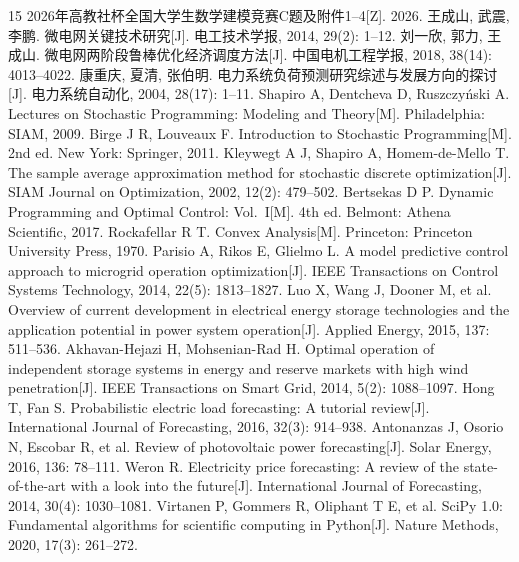 \documentclass[withoutpreface,bwprint]{cumcmthesis}
\begin{document}
\begin{thebibliography}{15}
 2026年高教社杯全国大学生数学建模竞赛C题及附件1--4[Z]. 2026.
 王成山, 武震, 李鹏. 微电网关键技术研究[J]. 电工技术学报, 2014, 29(2): 1--12.
 刘一欣, 郭力, 王成山. 微电网两阶段鲁棒优化经济调度方法[J]. 中国电机工程学报, 2018, 38(14): 4013--4022.
 康重庆, 夏清, 张伯明. 电力系统负荷预测研究综述与发展方向的探讨[J]. 电力系统自动化, 2004, 28(17): 1--11.
 Shapiro A, Dentcheva D, Ruszczy\'nski A. Lectures on Stochastic Programming: Modeling and Theory[M]. Philadelphia: SIAM, 2009.
 Birge J R, Louveaux F. Introduction to Stochastic Programming[M]. 2nd ed. New York: Springer, 2011.
 Kleywegt A J, Shapiro A, Homem-de-Mello T. The sample average approximation method for stochastic discrete optimization[J]. SIAM Journal on Optimization, 2002, 12(2): 479--502.
 Bertsekas D P. Dynamic Programming and Optimal Control: Vol.~I[M]. 4th ed. Belmont: Athena Scientific, 2017.
 Rockafellar R T. Convex Analysis[M]. Princeton: Princeton University Press, 1970.
 Parisio A, Rikos E, Glielmo L. A model predictive control approach to microgrid operation optimization[J]. IEEE Transactions on Control Systems Technology, 2014, 22(5): 1813--1827.
 Luo X, Wang J, Dooner M, et al. Overview of current development in electrical energy storage technologies and the application potential in power system operation[J]. Applied Energy, 2015, 137: 511--536.
 Akhavan-Hejazi H, Mohsenian-Rad H. Optimal operation of independent storage systems in energy and reserve markets with high wind penetration[J]. IEEE Transactions on Smart Grid, 2014, 5(2): 1088--1097.
 Hong T, Fan S. Probabilistic electric load forecasting: A tutorial review[J]. International Journal of Forecasting, 2016, 32(3): 914--938.
 Antonanzas J, Osorio N, Escobar R, et al. Review of photovoltaic power forecasting[J]. Solar Energy, 2016, 136: 78--111.
 Weron R. Electricity price forecasting: A review of the state-of-the-art with a look into the future[J]. International Journal of Forecasting, 2014, 30(4): 1030--1081.
 Virtanen P, Gommers R, Oliphant T E, et al. SciPy 1.0: Fundamental algorithms for scientific computing in Python[J]. Nature Methods, 2020, 17(3): 261--272.
\end{thebibliography}

\newpage
\appendix
\renewcommand{\thesubsection}{\thesection.\arabic{subsection}}
\begingroup
{}
\small

\FloatBarrier
\endgroup
\end{document}
